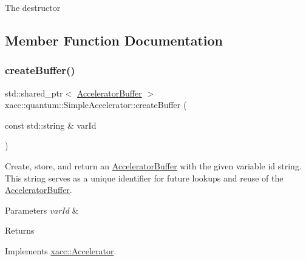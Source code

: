 The destructor 

\subsection{Member Function Documentation}
\mbox{\label{a01244_a46445d77d4b8ad2689571d0db6604380}} 
\subsubsection{\texorpdfstring{create\+Buffer()}{createBuffer()}\hspace{0.1cm}{\footnotesize\ttfamily [1/2]}}
{\footnotesize\ttfamily std\+::shared\+\_\+ptr$<$ \hyperlink{a02444}{Accelerator\+Buffer} $>$ xacc\+::quantum\+::\+Simple\+Accelerator\+::create\+Buffer (\begin{DoxyParamCaption}\item[{const std\+::string \&}]{var\+Id }\end{DoxyParamCaption})\hspace{0.3cm}{\ttfamily [virtual]}}

Create, store, and return an \hyperlink{a02444}{Accelerator\+Buffer} with the given variable id string. This string serves as a unique identifier for future lookups and reuse of the \hyperlink{a02444}{Accelerator\+Buffer}.


\begin{DoxyParams}{Parameters}
{\em var\+Id} & \\
\hline
\end{DoxyParams}
\begin{DoxyReturn}{Returns}

\end{DoxyReturn}


Implements \hyperlink{a02432_aab5046e8d83ab390302e0f49533e95fc}{xacc\+::\+Accelerator}.

\mbox{\label{a01244_adb9393692e9f484df241aa5d014030d1}} 
